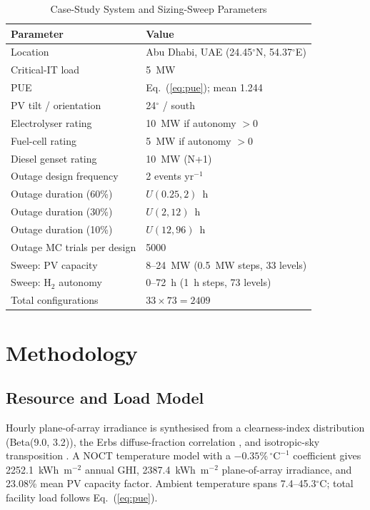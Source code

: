 \documentclass[conference]{IEEEtran}
\begin{document}
\begin{table}[t]
\centering
\caption{Case-Study System and Sizing-Sweep Parameters}
\label{tab:system}
\scriptsize
\begin{tabular}{@{}p{}p{}@{}}
\toprule
Parameter & Value \\
\midrule
Location & Abu Dhabi, UAE (24.45$^\circ$N, 54.37$^\circ$E) \\
Critical-IT load & 5~MW \\
PUE & Eq.~(\ref{eq:pue}); mean 1.244 \\
PV tilt / orientation & 24$^\circ$ / south \\
Electrolyser rating & 10~MW if autonomy $>0$ \\
Fuel-cell rating & 5~MW if autonomy $>0$ \\
Diesel genset rating & 10~MW (N+1) \\
Outage design frequency & 2 events yr$^{-1}$ \\
Outage duration (60\%) & $U(0.25, 2)$~h \\
Outage duration (30\%) & $U(2, 12)$~h \\
Outage duration (10\%) & $U(12, 96)$~h \\
Outage MC trials per design & 5000 \\
Sweep: PV capacity & 8--24~MW (0.5~MW steps, 33 levels) \\
Sweep: H$_2$ autonomy & 0--72~h (1~h steps, 73 levels) \\
Total configurations & $33\times73=2409$ \\
\bottomrule
\end{tabular}
\end{table}

\section{Methodology}

\subsection{Resource and Load Model}

Hourly plane-of-array irradiance is synthesised from a clearness-index distribution (Beta(9.0, 3.2)), the Erbs diffuse-fraction correlation \cite{erbs1982}, and isotropic-sky transposition \cite{duffie2013}. A NOCT temperature model with a $-0.35\%\,^{\circ}\mathrm{C}^{-1}$ coefficient gives 2252.1~kWh~m$^{-2}$ annual GHI, 2387.4~kWh~m$^{-2}$ plane-of-array irradiance, and 23.08\% mean PV capacity factor. Ambient temperature spans 7.4--45.3$^{\circ}$C; total facility load follows Eq.~(\ref{eq:pue}).
\end{document}
